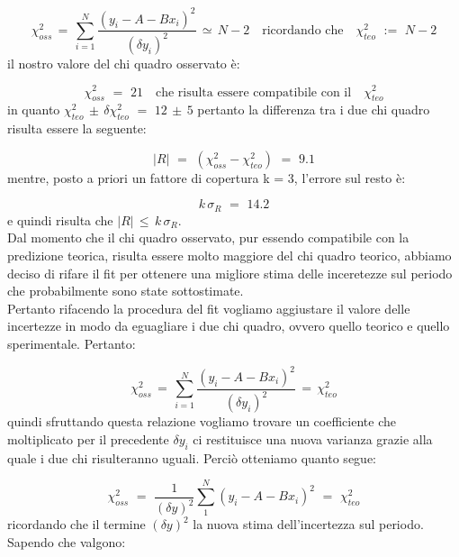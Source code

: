 \begin{equation*}
	\chi_{oss}^2 \,=\, \sum_{i=1}^{N} \frac{(y_i - A - Bx_i)^2}{(\delta y_i)^2} \,\simeq\, N - 2 \quad \text{ricordando che} \quad \chi_{teo}^2 \,\,:=\,\, N - 2
\end{equation*}
%
il nostro valore del chi quadro osservato è:

\begin{equation*}
	\chi_{oss}^2 \,\,=\,\, 21 \quad \text{che risulta essere compatibile con il} \quad \chi_{teo}^2
\end{equation*}
%
in quanto $\chi_{teo}^2 \, \pm \, \delta \chi_{teo}^2 \,\,=\,\, 12 \, \pm \, 5$ pertanto la differenza tra i due chi quadro risulta essere la seguente:

\begin{equation*}
	|R| \,\,=\,\, (\chi_{oss}^2 - \chi_{teo}^2) \,\,=\,\, 9.1
\end{equation*}
%
mentre, posto a priori un fattore di copertura k = 3, l'errore sul resto è:

\begin{equation*}
	k \, \sigma_{R} \,\,=\,\, 14.2
\end{equation*}
%
e quindi risulta che $|R| \, \leq \, k \, \sigma_{R}$.\\

Dal momento che il chi quadro osservato, pur essendo compatibile con la predizione teorica, risulta essere molto maggiore del chi quadro teorico, abbiamo deciso di rifare il fit per ottenere una migliore stima delle inceretezze sul periodo che probabilmente sono state sottostimate.\\
Pertanto rifacendo la procedura del fit vogliamo aggiustare il valore delle incertezze in modo da eguagliare i due chi quadro, ovvero quello teorico e quello sperimentale. Pertanto:

\begin{equation*}
	\chi_{oss}^2 \,=\, \sum_{i=1}^{N} \frac{(y_i - A - Bx_i)^2}{(\delta y_i)^2} \,=\, \chi_{teo}^2 
\end{equation*}
%
quindi sfruttando questa relazione vogliamo trovare un coefficiente che moltiplicato per il precedente $\delta y_i$ ci restituisce una nuova varianza grazie alla quale i due chi risulteranno uguali. Perciò otteniamo quanto segue:
	
\begin{equation*}
	\chi_{oss}^2 \,\,=\,\, \frac{1}{(\delta y)^2} \sum_{1}^{N} (y_i - A - Bx_i)^2  \,\,=\,\, \chi_{teo}^2
\end{equation*}
%
ricordando che il termine $(\delta y)^2$ la nuova stima dell'incertezza sul periodo. Sapendo che valgono:
	
